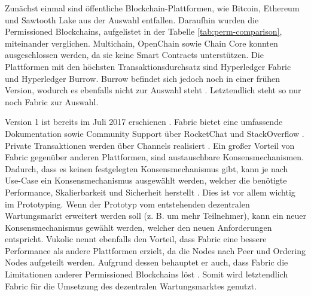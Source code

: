 Zunächst einmal sind öffentliche Blockchain-Plattformen, wie Bitcoin, Ethereum und Sawtooth Lake aus der Auswahl entfallen. Daraufhin wurden die Permissioned Blockchains, aufgelistet in der Tabelle \ref{tab:perm-comparison}, miteinander verglichen. Multichain, OpenChain sowie Chain Core konnten ausgeschlossen werden, da sie keine Smart Contracts unterstützen. Die Plattformen mit den höchsten Transaktionsdurchsatz sind Hyperledger Fabric und Hyperledger Burrow. Burrow befindet sich jedoch noch in einer frühen Version, wodurch es ebenfalls nicht zur Auswahl steht \cite{HyperledgerFabricTeamHyperledgerFabricReleases2018}. Letztendlich steht so nur noch Fabric zur Auswahl. 

Version 1 ist bereits im Juli 2017 erschienen \cite{HyperledgerFabricTeamHyperledgerFabricReleases2018}. Fabric bietet eine umfassende Dokumentation sowie Community Support über RocketChat und StackOverflow \cite{HyperledgerFabricTeamSupportHyperledgerFabric}. Private Transaktionen werden über Channels realisiert \cite{SchererPerformanceScalabilityBlockchain2017}. Ein großer Vorteil von Fabric gegenüber anderen Plattformen, sind austauschbare Konsensmechanismen. Dadurch, dass es keinen festgelegten Konsensmechanismus gibt, kann je nach Use-Case ein Konsensmechanismus ausgewählt werden, welcher die benötigte Performance, Skalierbarkeit und Sicherheit herstellt \cite{VukolicRethinkingPermissionedBlockchains2017}. Dies ist vor allem wichtig im Prototyping. Wenn der Prototyp vom entstehenden dezentralen Wartungsmarkt erweitert werden soll (z. B. um mehr Teilnehmer), kann ein neuer Konsensmechanismus gewählt werden, welcher den neuen Anforderungen entspricht. Vukolic nennt ebenfalls den Vorteil, dass Fabric eine bessere Performance als andere Plattformen erzielt, da die Nodes nach Peer und Ordering Nodes aufgeteilt werden. Aufgrund dessen behauptet er auch, dass Fabric die Limitationen anderer Permissioned Blockchains löst \cite{VukolicRethinkingPermissionedBlockchains2017}. Somit wird letztendlich Fabric für die Umsetzung des dezentralen Wartungsmarktes genutzt.

